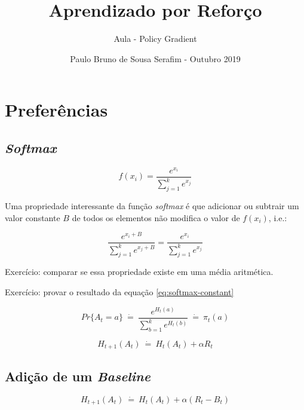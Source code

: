 \documentclass{article}
\title{Aprendizado por Reforço}
\author{Aula  - Policy Gradient}
\date{Paulo Bruno de Sousa Serafim - Outubro 2019}
\begin{document}
\maketitle

\section{Preferências}

    \subsection{\emph{Softmax}}
        
        \begin{equation}
            f(x_i) = \frac{e^{x_i}}{\sum_{j=1}^{k}e^{x_j}}
        \end{equation}
    
        Uma propriedade interessante da função \emph{softmax} é que adicionar ou subtrair um valor constante $B$ de todos os elementos não modifica o valor de $f(x_i)$, i.e.:
        
        \begin{equation}
        \label{eq:softmax-constant}
            \frac{e^{x_i + B}}{\sum_{j=1}^{k}e^{x_j + B}} = \frac{e^{x_i}}{\sum_{j=1}^{k}e^{x_j}}
        \end{equation}
    
        Exercício: comparar se essa propriedade existe em uma média aritmética.
        
        Exercício: provar o resultado da equação \eqref{eq:softmax-constant}

        \begin{equation}
            Pr\{A_t=a\} \ \dot{=} \  \frac{e^{H_t(a)}}{\sum_{b=1}^{k}e^{H_t(b)}} \ \dot{=} \ \pi_t(a)
        \end{equation}
    
        \begin{equation}
            H_{t+1}(A_t) \ \dot{=} \ H_t(A_t) + \alpha R_t
        \end{equation}

    \subsection{Adição de um \emph{Baseline}}
    
        \begin{equation}
            H_{t+1}(A_t) \ \dot{=} \ H_t(A_t) + \alpha (R_t - B_t)
        \end{equation}
    
\end{document}
